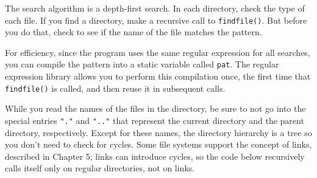 
The search algorithm is a depth-first search. In each directory, check
the type of each file. If you find a directory, make a recursive call
to \texttt{findfile()}. But before you do that, check to see if the
name of the file matches the pattern. 

For efficiency, since the program uses the same regular expression for
all searches, you can compile the pattern into a static variable called
\texttt{pat}. The regular expression library allows you to perform this
compilation once, the first time that \texttt{findfile()} is called,
and then reuse it in subsequent calls.


While you read the names of the files in the directory, be sure to not
go into the special entries \texttt{"."}
and \texttt{".."} that represent the
current directory and the parent directory, respectively. Except for
these names, the directory hierarchy is a tree so you
don't need to check for cycles. Some file systems
support the concept of links, described in
Chapter 5; links can introduce cycles, so the code below
recursively calls itself only on regular
directories, not on links.

